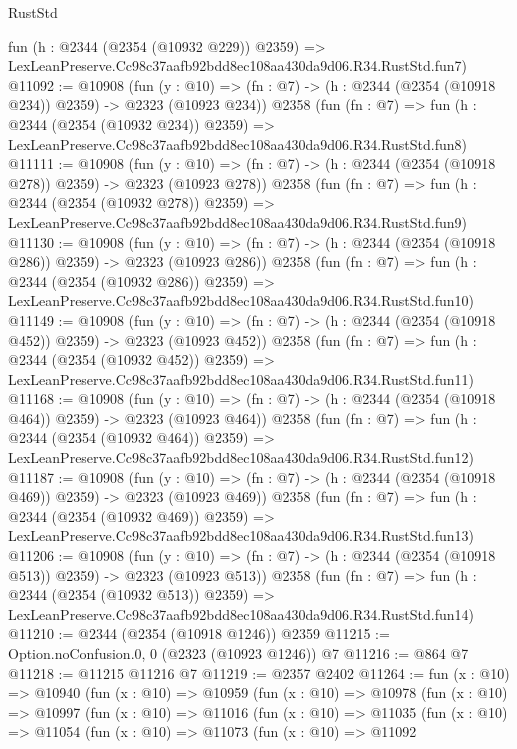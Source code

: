 \begin{lexlean}{RustStd}
\begin{coremodule}
    fun (h : @2344 (@2354 (@10932 @229)) @2359) =>
    LexLeanPreserve.Cc98c37aafb92bdd8ec108aa430da9d06.R34.RustStd.fun7)
@11092 := @10908
    (fun (y : @10) => (fn : @7) -> (h : @2344 (@2354 (@10918 @234)) @2359) -> @2323 (@10923 @234))
    @2358
    (fun (fn : @7) =>
    fun (h : @2344 (@2354 (@10932 @234)) @2359) =>
    LexLeanPreserve.Cc98c37aafb92bdd8ec108aa430da9d06.R34.RustStd.fun8)
@11111 := @10908
    (fun (y : @10) => (fn : @7) -> (h : @2344 (@2354 (@10918 @278)) @2359) -> @2323 (@10923 @278))
    @2358
    (fun (fn : @7) =>
    fun (h : @2344 (@2354 (@10932 @278)) @2359) =>
    LexLeanPreserve.Cc98c37aafb92bdd8ec108aa430da9d06.R34.RustStd.fun9)
@11130 := @10908
    (fun (y : @10) => (fn : @7) -> (h : @2344 (@2354 (@10918 @286)) @2359) -> @2323 (@10923 @286))
    @2358
    (fun (fn : @7) =>
    fun (h : @2344 (@2354 (@10932 @286)) @2359) =>
    LexLeanPreserve.Cc98c37aafb92bdd8ec108aa430da9d06.R34.RustStd.fun10)
@11149 := @10908
    (fun (y : @10) => (fn : @7) -> (h : @2344 (@2354 (@10918 @452)) @2359) -> @2323 (@10923 @452))
    @2358
    (fun (fn : @7) =>
    fun (h : @2344 (@2354 (@10932 @452)) @2359) =>
    LexLeanPreserve.Cc98c37aafb92bdd8ec108aa430da9d06.R34.RustStd.fun11)
@11168 := @10908
    (fun (y : @10) => (fn : @7) -> (h : @2344 (@2354 (@10918 @464)) @2359) -> @2323 (@10923 @464))
    @2358
    (fun (fn : @7) =>
    fun (h : @2344 (@2354 (@10932 @464)) @2359) =>
    LexLeanPreserve.Cc98c37aafb92bdd8ec108aa430da9d06.R34.RustStd.fun12)
@11187 := @10908
    (fun (y : @10) => (fn : @7) -> (h : @2344 (@2354 (@10918 @469)) @2359) -> @2323 (@10923 @469))
    @2358
    (fun (fn : @7) =>
    fun (h : @2344 (@2354 (@10932 @469)) @2359) =>
    LexLeanPreserve.Cc98c37aafb92bdd8ec108aa430da9d06.R34.RustStd.fun13)
@11206 := @10908
    (fun (y : @10) => (fn : @7) -> (h : @2344 (@2354 (@10918 @513)) @2359) -> @2323 (@10923 @513))
    @2358
    (fun (fn : @7) =>
    fun (h : @2344 (@2354 (@10932 @513)) @2359) =>
    LexLeanPreserve.Cc98c37aafb92bdd8ec108aa430da9d06.R34.RustStd.fun14)
@11210 := @2344 (@2354 (@10918 @1246)) @2359
@11215 := Option.noConfusion.{0, 0} (@2323 (@10923 @1246)) @7
@11216 := @864 @7
@11218 := @11215 @11216 @7
@11219 := @2357 @2402
@11264 := fun (x : @10) =>
  @10940
    (fun (x : @10) =>
    @10959
      (fun (x : @10) =>
      @10978
        (fun (x : @10) =>
        @10997
          (fun (x : @10) =>
          @11016
            (fun (x : @10) =>
            @11035
              (fun (x : @10) =>
              @11054
                (fun (x : @10) =>
                @11073
                  (fun (x : @10) =>
                  @11092

\end{coremodule}
\end{lexlean}
